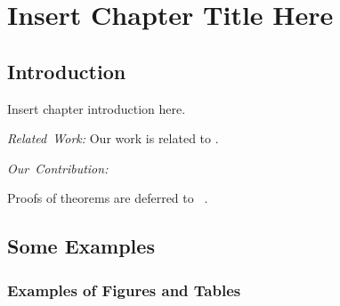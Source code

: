 
\chapter{Insert Chapter Title Here}
\label{Section:ChapAbbr}



\section{Introduction}
\label{Section:ChapAbbr:Introduction}

Insert chapter introduction here.
\lipsum[1-2]

\mbox{\textit{Related Work:}}
Our work is related to \cite{Examples:Conference01, Examples:Journal01, Examples:Conference02, Examples:Journal02, Examples:Conference03}.
\lipsum[3-4]

\mbox{\textit{Our Contribution:}}
\lipsum[5-6]

Proofs of theorems are deferred to \Section~.


\section{Some Examples}
\label{Section:ChapAbbr:SomeExamples}

\lipsum[7]


\subsection{Examples of Figures and Tables}
\label{Section:ChapAbbr:SomeExamples:FiguresTables}

